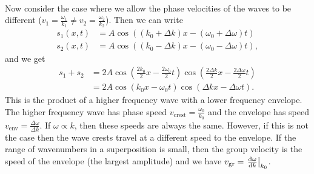 \documentclass[../classical_mechanics.tex]{subfiles}
\begin{document}
        \paragraph{}
        Now consider the case where we allow the phase velocities of the waves to be different ($v_1=\frac{\omega_1}{k_1}\neq v_2=\frac{\omega_2}{k_2}$).
        Then we can write
        \begin{align}
            s_1(x,t)&=A\cos((k_0+\Delta k)x-(\omega_0+\Delta\omega)t)\\
            s_2(x,t)&=A\cos((k_0-\Delta k)x-(\omega_0-\Delta\omega)t),
        \end{align}
        and we get
        \begin{align}
            s_1+s_2&=2A\cos\left(\frac{2k_0}{2}x-\frac{2\omega_0}{2}t\right)\cos\left(\frac{2\Delta k}{2}x-\frac{2\Delta\omega}{2}t\right)\\
            &=2A\cos(k_0x-\omega_0t)\cos(\Delta kx-\Delta\omega t).
        \end{align}
        This is the product of a higher frequency wave with a lower frequency envelope.
        The higher frequency wave has phase speed $v_\text{crest}=\frac{\omega_0}{k_0}$ and the envelope has speed $v_\text{env}=\frac{\Delta\omega}{\Delta k}$.
        If $\omega\propto k$, then these speeds are always the same.
        However, if this is not the case then the wave crests travel at a different speed to the envelope.
        If the range of wavenumbers in a superposition is small, then the group velocity is the speed of the envelope (the largest amplitude) and we have $v_\text{gr}=\left.\dv{\omega}{k}\right|_{k_0}$.
        
\end{document}
